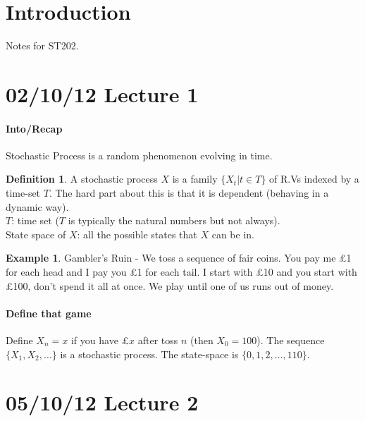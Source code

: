 \documentclass{article}
\theoremstyle{definition}
\newtheorem{defn}[thm]{Definition}
\newtheorem{ex}[thm]{Example}
\begin{document}
\maketitle
\tableofcontents

\section{Introduction}
Notes for ST202.
\clearpage

\section{02/10/12 Lecture 1}

\paragraph*{Into/Recap}

Stochastic Process is a random phenomenon evolving in time.

\begin{defn} A stochastic process $X$ is a family $\{ X_t | t \in T \}$ of R.Vs indexed by a time-set $T$. The hard part about this is that it is dependent (behaving in a dynamic way).\\

$T$: time set ($T$ is typically the natural numbers but not always).\\

State space of $X$: all the possible states that $X$ can be in.\\
\end{defn}

\begin{ex}
Gambler's Ruin - We toss a sequence of fair coins. You pay me \pounds1 for each head and I pay you \pounds1 for each tail. I start with \pounds10 and you start with \pounds100, don't spend it all at once. We play until one of us runs out of money.

\paragraph*{Define that game}

Define $X_n = x$ if you have \pounds$x$ after toss $n$ (then $X_0 = 100$). The sequence $\{ X_1, X_2, \ldots \}$ is a stochastic process. The state-space is $\{0, 1, 2, \ldots, 110 \}$.
\end{ex}

\section{05/10/12 Lecture 2}
\end{document}
